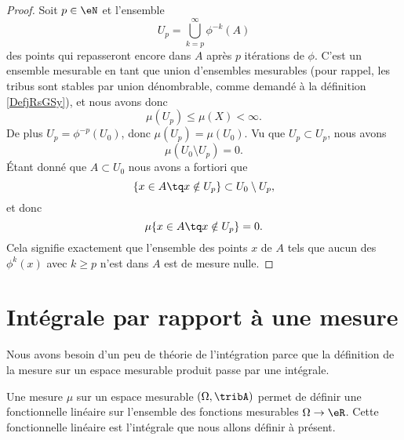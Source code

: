 \begin{proof}
    Soit \( p\in \eN\) et l'ensemble
    \begin{equation}
        U_p=\bigcup_{k=p}^{\infty}\phi^{-k}(A)
    \end{equation}
    des points qui repasseront encore dans \( A\) après \( p\) itérations  de \( \phi\). C'est un ensemble mesurable en tant que union d'ensembles mesurables (pour rappel, les tribus sont stables par union dénombrable, comme demandé à la définition \ref{DefjRsGSy}), et nous avons donc
    \begin{equation}
        \mu(U_p)\leq \mu(X)<\infty.
    \end{equation}
    De plus \( U_p=\phi^{-p}(U_0)\), donc \( \mu(U_p)=\mu(U_0)\). Vu que \( U_p\subset U_p\), nous avons
    \begin{equation}
        \mu(U_0\setminus U_p)=0.
    \end{equation}
    Étant donné que \( A\subset U_0\) nous avons a fortiori que
    \begin{equation}
        \{ x\in A\tq x\notin U_p \}\subset U_0\setminus U_p,
    \end{equation}
    et donc
    \begin{equation}
        \mu\{ x\in A\tq x\notin U_p \}=0.
    \end{equation}
    Cela signifie exactement que l'ensemble des points \( x\) de \( A\) tels que aucun des \( \phi^k(x)\) avec \( k\geq p\) n'est dans \( A\) est de mesure nulle.
\end{proof}

\section{Intégrale par rapport à une mesure}

Nous avons besoin d'un peu de théorie de l'intégration parce que la définition de la mesure sur un espace mesurable produit passe par une intégrale.


Une mesure \( \mu\) sur un espace mesurable \( (\Omega,\tribA)\) permet de définir une fonctionnelle linéaire sur l'ensemble des fonctions mesurables \( \Omega\to \eR\). Cette fonctionnelle linéaire est l'intégrale que nous allons définir à présent.

